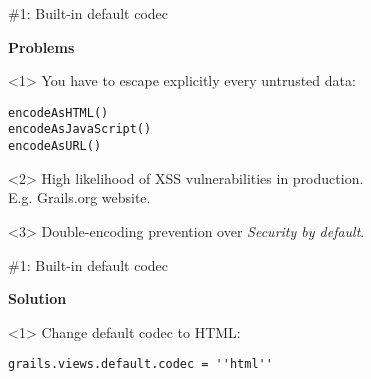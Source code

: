 {\begin{frame}
    \begin{center}
      \Huge\color{red} \#1: Built-in default codec \\
    \end{center}

    \vspace{1cm}

    \Large
    \textbf{Problems} \\[1em]

    \begin{onlyenv}<1>
      You have to escape explicitly every untrusted data:
      \begin{center}
        \begin{minipage}{.9\textwidth}
          \begin{verbatim}
encodeAsHTML()
encodeAsJavaScript()
encodeAsURL()
          \end{verbatim}
        \end{minipage}
      \end{center}
    \end{onlyenv}

    \begin{onlyenv}<2>
      High likelihood of XSS vulnerabilities in production.\\[1em]
      E.g. Grails.org website.
    \end{onlyenv}

    \begin{onlyenv}<3>
      Double-encoding prevention over \emph{Security by default}.
    \end{onlyenv}

    \vfill

\end{frame}

\begin{frame}

    \vspace{.5cm}

    \begin{center}
      \Huge\color{red} \#1: Built-in default codec \\
    \end{center}

    \vspace{1cm}

    \Large
    \textbf{Solution} \\[1em]

    \begin{onlyenv}<1>
      Change default codec to HTML:
      \begin{center}
        \begin{minipage}{.9\textwidth}
          \begin{verbatim}
grails.views.default.codec = ''html''
          \end{verbatim}
        \end{minipage}
      \end{center}
    \end{onlyenv}


\end{frame}}
